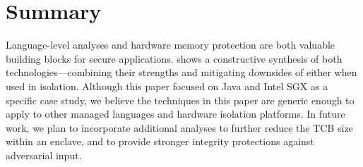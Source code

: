 \section{Summary}
\label{sec:civet:summary}

Language-level analyses and hardware memory protection are both valuable
building blocks for secure applications.
\sysname{} shows a constructive synthesis of both technologies---combining their strengths
and mitigating downsides of either when used in isolation.
Although this paper focused on Java and Intel SGX as a specific case study,
we believe the techniques in this paper are generic enough to apply to
other managed languages and hardware isolation platforms.
In future work, we plan to incorporate additional analyses
to further reduce the TCB size within an enclave, and to provide
stronger integrity protections against adversarial input.


